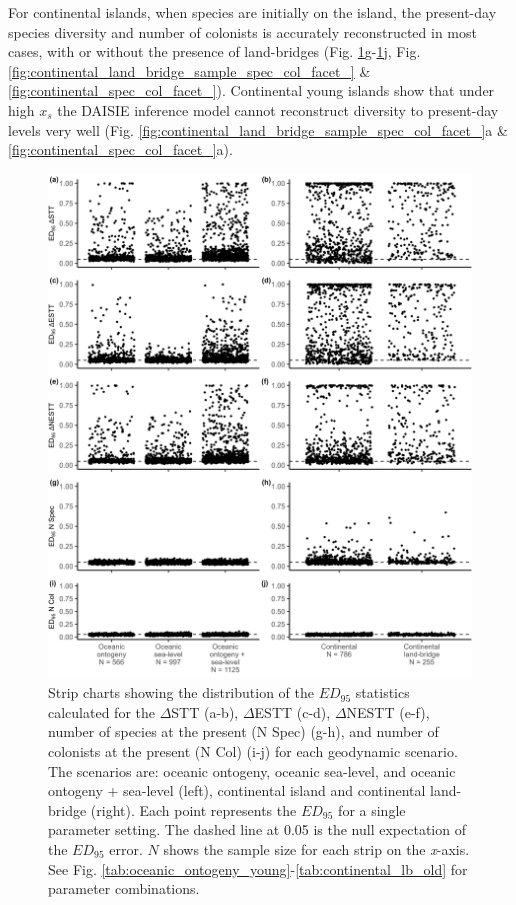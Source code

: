 \documentclass{article}
\begin{document}
For continental islands, when species are initially on the island, the present-day species diversity and number of colonists is accurately reconstructed in most cases, with or without the presence of land-bridges (Fig. \ref{fig:scenario}g-\ref{fig:scenario}j, Fig.  \ref{fig:continental_land_bridge_sample_spec_col_facet_} \& \ref{fig:continental_spec_col_facet_}). Continental young islands show that under high $x_s$ the DAISIE inference model cannot reconstruct diversity to present-day levels very well (Fig. \ref{fig:continental_land_bridge_sample_spec_col_facet_}a \& \ref{fig:continental_spec_col_facet_}a).

\clearpage

\begin{figure}
    \includegraphics[width=\textwidth]{JBI-21-0508_Fig4.png}
    \caption{Strip charts showing the distribution of the $ED_{95}$ statistics calculated for the $\Delta$STT (a-b), $\Delta$ESTT (c-d), $\Delta$NESTT (e-f), number of species at the present (N Spec) (g-h), and number of colonists at the present (N Col) (i-j) for each geodynamic scenario. The scenarios are: oceanic ontogeny, oceanic sea-level, and oceanic ontogeny + sea-level (left), continental island and continental land-bridge (right). Each point represents the $ED_{95}$ for a single parameter setting. The dashed line at 0.05 is the null expectation of the $ED_{95}$ error. $N$ shows the sample size for each strip on the \textit{x}-axis. See Fig. \ref{tab:oceanic_ontogeny_young}-\ref{tab:continental_lb_old} for parameter combinations.}
    \label{fig:scenario}
\end{figure}
\end{document}
